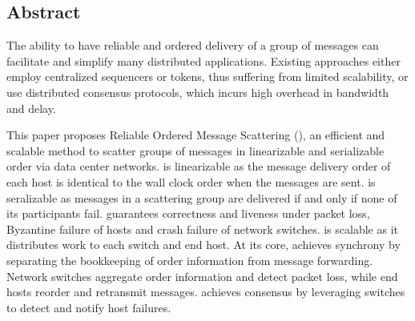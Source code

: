 \subsection*{Abstract}

The ability to have reliable and ordered delivery of a group of messages can facilitate and simplify many distributed applications.
Existing approaches either employ centralized sequencers or tokens, thus suffering from limited scalability, or use distributed consensus protocols, which incurs high overhead in bandwidth and delay.

This paper proposes Reliable Ordered Message Scattering (\sys), an efficient and scalable method to scatter groups of messages in linearizable and serializable order via data center networks.
\sys is linearizable as the message delivery order of each host is identical to the wall clock order when the messages are sent.
\sys is seralizable as messages in a scattering group are delivered if and only if none of its participants fail.
\sys guarantees correctness and liveness under packet loss, Byzantine failure of hosts and crash failure of network switches.
\sys is scalable as it distributes work to each switch and end host.
At its core, \sys achieves synchrony by separating the bookkeeping of order information from message forwarding.
Network switches aggregate order information and detect packet loss, while end hosts reorder and retransmit messages.
\sys achieves consensus by leveraging switches to detect and notify host failures.



